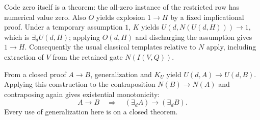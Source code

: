 Code zero itself is a theorem: the all-zero instance of the restricted
row has numerical value zero. Also $O$ yields explosion $1\to H$ by a
fixed implicational proof. Under a temporary assumption $1$, $K$ yields
$U(d,N(U(d,H)))\to1$, which is $\exists_d U(d,H)$; applying $O(d,H)$
and discharging the assumption gives $1\to H$. Consequently the usual
classical templates relative to $N$ apply, including extraction of
$V$ from the retained gate $N(I(V,Q))$.

From a closed proof $A\to B$, generalization and $K_U$ yield
$U(d,A)\to U(d,B)$. Applying this construction to the contraposition
$N(B)\to N(A)$ and contraposing again gives existential monotonicity:
\[
 A\to B\quad\Longrightarrow\quad
 (\exists_d A)\to(\exists_d B).
 \tag{EM}
\]
Every use of generalization here is on a closed theorem.

